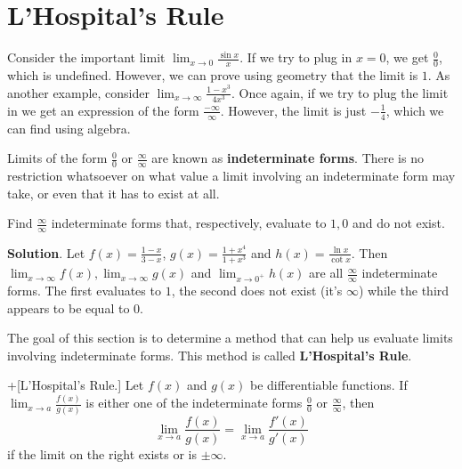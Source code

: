 \documentclass[10pt,]{book}
\newcommand{\terminology}[1]{\textbf{#1}}
\theoremstyle{ptxplainnotitle}
\theoremstyle{ptxplaintitle}
\theoremstyle{ptxplainnotitle}
\theoremstyle{ptxplaintitle}
\theoremstyle{ptxplainnotitle}
\theoremstyle{ptxplaintitle}
\theoremstyle{ptxdefinitionnotitle}
\theoremstyle{ptxdefinitiontitle}
\theoremstyle{ptxdefinitionnotitle}
\theoremstyle{ptxdefinitiontitle}
\theoremstyle{ptxdefinitionnotitle}
\theoremstyle{ptxdefinitiontitle}
\theoremstyle{ptxdefinitionnotitle}
\theoremstyle{ptxdefinitiontitle}
\theoremstyle{ptxdefinitionnotitle}
\theoremstyle{ptxdefinitiontitle}
\numberwithin{equation}{section}
\begin{document}
\section[{L'Hospital's Rule}]{L'Hospital's Rule}\label{section-l-hospital-s-rule}
\hypertarget{p-282}{}%
Consider the important limit \(\lim_{x\to0}\frac{\sin x}{x}\). If we try to plug in \(x=0\), we get \(\frac{0}{0}\), which is undefined. However, we can prove using geometry that the limit is \(1\). As another example, consider \(\lim_{x\to\infty}\frac{1-x^{3}}{4x^{3}}\). Once again, if we try to plug the limit in we get an expression of the form \(\frac{-\infty}{\infty}\). However, the limit is just \(-\frac{1}{4}\), which we can find using algebra.%
\par
\hypertarget{p-283}{}%
Limits of the form \(\frac{0}{0}\) or \(\frac{\infty}{\infty}\) are known as \terminology{indeterminate forms}. There is no restriction whatsoever on what value a limit involving an indeterminate form may take, or even that it has to exist at all.%
\begin{example}\label{example-different-indeterminate-forms}
\hypertarget{p-284}{}%
Find \(\frac{\infty}{\infty}\) indeterminate forms that, respectively, evaluate to \(1, 0\) and do not exist.%
\par\smallskip%
\noindent\textbf{Solution}.\hypertarget{solution-62}{}\quad%
\hypertarget{p-285}{}%
Let \(f(x) = \frac{1-x}{3-x}\), \(g(x) = \frac{1+x^{4}}{1+x^{3}}\) and \(h(x) = \frac{\ln x}{\cot x}\). Then \(\lim_{x\to\infty}f(x), \lim_{x\to\infty}g(x)\) and \(\lim_{x\to0^{+}}h(x)\) are all \(\frac{\infty}{\infty}\) indeterminate forms. The first evaluates to \(1\), the second does not exist (it's \(\infty\)) while the third appears to be equal to \(0\).%
\end{example}
\hypertarget{p-286}{}%
The goal of this section is to determine a method that can help us evaluate limits involving indeterminate forms. This method is called \terminology{L'Hospital's Rule}.%
\begin{theorem}+[{L'Hospital's Rule.}]\label{theorem-l-hospital-s-rule}
\hypertarget{p-287}{}%
Let \(f(x)\) and \(g(x)\) be differentiable functions. If \(\lim_{x\to a}\frac{f(x)}{g(x)}\) is either one of the indeterminate forms \(\frac{0}{0}\) or \(\frac{\infty}{\infty}\), then%
\begin{equation*}
\lim_{x\to a}\frac{f(x)}{g(x)} = \lim_{x\to a}\frac{f'(x)}{g'(x)}
\end{equation*}
if the limit on the right exists or is \(\pm\infty\).%
\end{theorem}
\end{document}
